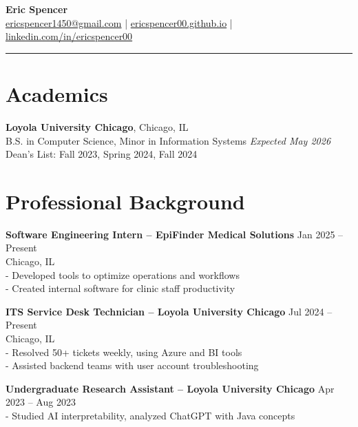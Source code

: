 \documentclass[10pt]{article}
\begin{document}
\begin{center}
    {\LARGE \textbf{Eric Spencer}} \\[3pt]
    \href{mailto:ericspencer1450@gmail.com}{ericspencer1450@gmail.com} \quad | \quad 
    \href{https://ericspencer00.github.io}{ericspencer00.github.io} \quad | \quad
    \href{https://linkedin.com/in/ericspencer00}{linkedin.com/in/ericspencer00}
\end{center}

\vspace{8pt}
\noindent\rule{\textwidth}{0.5pt}

\section*{Academics}
\textbf{Loyola University Chicago}, Chicago, IL \\
B.S. in Computer Science, Minor in Information Systems \hfill \textit{Expected May 2026} \\
Dean’s List: Fall 2023, Spring 2024, Fall 2024

\vspace{10pt}
\section*{Professional Background}
\textbf{Software Engineering Intern – EpiFinder Medical Solutions} \hfill Jan 2025 – Present \\
Chicago, IL \\
- Developed tools to optimize operations and workflows \\
- Created internal software for clinic staff productivity

\vspace{6pt}
\textbf{ITS Service Desk Technician – Loyola University Chicago} \hfill Jul 2024 – Present \\
Chicago, IL \\
- Resolved 50+ tickets weekly, using Azure and BI tools \\
- Assisted backend teams with user account troubleshooting

\vspace{6pt}
\textbf{Undergraduate Research Assistant – Loyola University Chicago} \hfill Apr 2023 – Aug 2023 \\
- Studied AI interpretability, analyzed ChatGPT with Java concepts

\vspace{10pt}
\end{document}
